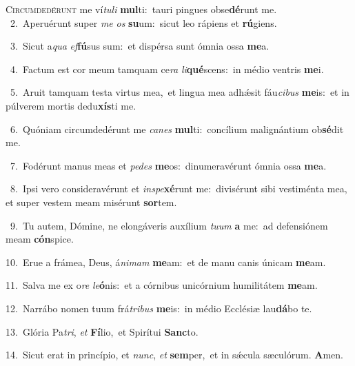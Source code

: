 \lettrine{\initial\textcolor{\initialcolor}{C}}{ircumdedérunt} me ví\-\textit{tu}\-\textit{li} \textbf{mul}\-ti:~\star tauri pingues obse\-\textbf{dé}\-runt me.\\
{\numbfont\textcolor{\numbcolor}{~2.}}~Aperuérunt super \textit{me} \textit{os} \textbf{su}\-um:~\star sicut leo rápiens et \textbf{rú}\-giens.\par
{\numbfont\textcolor{\numbcolor}{~3.}}~Sicut a\textit{qua} \textit{ef}\-\textbf{fú}sus sum:~\star et dispérsa sunt ómnia ossa \textbf{me}\-a.\par
{\numbfont\textcolor{\numbcolor}{~4.}}~Factum est cor meum tamquam ce\textit{ra} \textit{li}\-\textbf{qué}scens:~\star in médio ventris \textbf{me}\-i.\par
{\numbfont\textcolor{\numbcolor}{~5.}}~Aruit tamquam testa virtus mea,~\dagger et lingua mea adhǽsit fáu\-\textit{ci}\-\textit{bus} \textbf{me}\-is:~\star et in púlverem mortis dedu\-\textbf{xís}\-ti me.\par
{\numbfont\textcolor{\numbcolor}{~6.}}~Quóniam circumdedérunt me \textit{ca}\-\textit{nes} \textbf{mul}\-ti:~\star concílium malignántium ob\-\textbf{sé}\-dit me.\par
{\numbfont\textcolor{\numbcolor}{~7.}}~Fodérunt manus meas et \textit{pe}\-\textit{des} \textbf{me}\-os:~\star dinumeravérunt ómnia ossa \textbf{me}\-a.\par
{\numbfont\textcolor{\numbcolor}{~8.}}~Ipsi vero consideravérunt et \textit{in}\-\textit{spe}\textbf{xé}runt me:~\star divisérunt sibi vestiménta mea, et super vestem meam misérunt \textbf{sor}\-tem.\par
{\numbfont\textcolor{\numbcolor}{~9.}}~Tu autem, Dómine, ne elongáveris auxílium \textit{tu}\-\textit{um} \textbf{a} me:~\star ad defensiónem meam \textbf{cón}\-spice.\par
{\numbfont\textcolor{\numbcolor}{10.}}~Erue a frámea, Deus, á\-\textit{ni}\-\textit{mam} \textbf{me}\-am:~\star et de manu canis únicam \textbf{me}\-am.\par
{\numbfont\textcolor{\numbcolor}{11.}}~Salva me ex o\textit{re} \textit{le}\-\textbf{ó}nis:~\star et a córnibus unicórnium humilitátem \textbf{me}\-am.\par
{\numbfont\textcolor{\numbcolor}{12.}}~Narrábo nomen tuum frá\-\textit{tri}\-\textit{bus} \textbf{me}\-is:~\star in médio Ecclésiæ lau\-\textbf{dá}\-bo te.\par
{\numbfont\textcolor{\numbcolor}{13.}}~Glória Pa\-\textit{tri}\-, \textit{et} \textbf{Fí}\-lio,~\star et Spirítui \textbf{Sanc}\-to.\par
{\numbfont\textcolor{\numbcolor}{14.}}~Sicut erat in princípio, et \textit{nunc}\-, \textit{et} \textbf{sem}\-per,~\star et in sǽcula sæculórum. \textbf{A}\-men.\par
